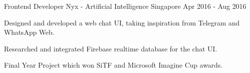 \begin{cventries}
  \cventry
    {Frontend Developer} %
    {Nyx - Artificial Intelligence} %
    {Singapore} %
    {Apr 2016 - Aug 2016} %
    {
      \begin{cvitems} %
        \item {Designed and developed a web chat UI, taking inspiration from Telegram and WhatsApp Web.}
        \item {Researched and integrated Firebase realtime database for the chat UI.}
        \item {Final Year Project which won SiTF and Microsoft Imagine Cup awards.}
      \end{cvitems}
    }

\end{cventries}
